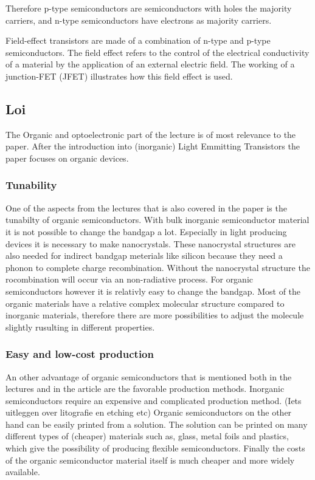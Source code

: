 Therefore p-type semiconductors are semiconductors with holes the majority carriers, and n-type semiconductors have electrons as majority carriers.

Field-effect transistors are made of a combination of n-type and p-type semiconductors. The field effect refers to the control of the electrical conductivity of a material by the application of an external electric field. The working of a junction-FET (JFET) illustrates how this field effect is used.

\subsection{Loi}
The Organic and optoelectronic part of the lecture is of most relevance to the paper. After the introduction into (inorganic) Light Emmitting Transistors the paper focuses on organic devices. 

\subsubsection{Tunability}
One of the aspects from the lectures that is also covered in the paper is the tunabilty of organic semiconductors. With bulk inorganic semiconductor material it is not possible to change the bandgap a lot. Especially in light producing devices it is necessary to make nanocrystals. These nanocrystal structures are also needed for indirect bandgap meterials like silicon because they need a phonon to complete charge recombination. Without the nanocrystal structure the rocombination will occur via an non-radiative process. For organic semiconductors however it is relativly easy to change the bandgap. Most of the organic materials have a relative complex molecular structure compared to inorganic materials, therefore there are more possibilities to adjust the molecule slightly rusulting in different properties. 
\subsubsection{Easy and low-cost production}
An other advantage of organic semiconductors that is mentioned both in the lectures and in the article are the favorable production methods. Inorganic semiconductors require an expensive and complicated production method. (Iets uitleggen over litografie en etching etc) Organic semiconductors on the other hand can be easily printed from a solution. The solution can be printed on many different types of (cheaper) materials such as, glass, metal foils and plastics, which give the possibility of producing flexible semiconductors. Finally the costs of the organic semiconductor material itself is much cheaper and more widely available.
